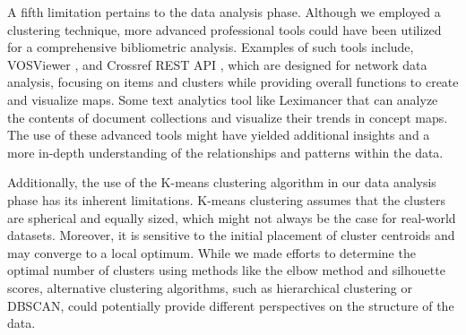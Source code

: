 \documentclass[final-report.tex]{subfiles}
\begin{document}
A fifth limitation pertains to the data analysis phase. 
Although we employed a clustering technique, more advanced professional tools could have been utilized for a comprehensive bibliometric analysis. 
Examples of such tools include, VOSViewer \cite{van2013vosviewer}, and Crossref REST API \cite{lammey2016using}, which are designed for network data analysis, focusing on items and clusters while providing overall functions to create and visualize maps. 
Some text analytics tool like Leximancer \cite{sotiriadou2014choosing} that can analyze the contents of document collections and visualize their trends in concept maps. 
The use of these advanced tools might have yielded additional insights and a more in-depth understanding of the relationships and patterns within the data.

Additionally, the use of the K-means clustering algorithm in our data analysis phase has its inherent limitations. 
K-means clustering assumes that the clusters are spherical and equally sized, which might not always be the case for real-world datasets. 
Moreover, it is sensitive to the initial placement of cluster centroids and may converge to a local optimum. 
While we made efforts to determine the optimal number of clusters using methods like the elbow method and silhouette scores, alternative clustering algorithms, such as hierarchical clustering or DBSCAN, could potentially provide different perspectives on the structure of the data.
\end{document}
